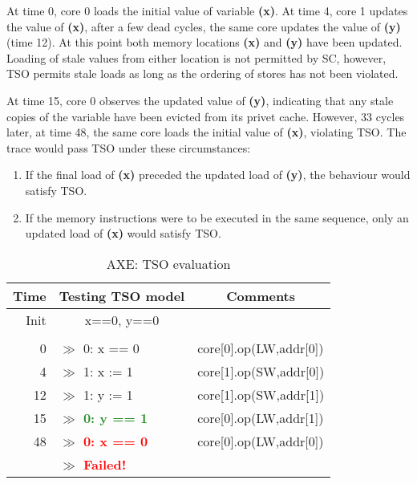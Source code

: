 			At time 0, core 0 loads the initial value of variable \textbf{(x)}. At time 4, core 1 updates the value of \textbf{(x)}, after a few dead cycles, the same core updates the value of \textbf{(y)} (time 12). At this point both memory locations \textbf{(x)} and \textbf{(y)} have been updated. Loading of stale values from either location is not permitted by SC, however, TSO permits stale loads as long as the ordering of stores has not been violated. 
			
			At time 15, core 0 observes the updated value of \textbf{(y)}, indicating that any stale copies of the variable have been evicted from its privet cache. However, 33 cycles later, at time 48, the same core loads the initial value of \textbf{(x)}, violating TSO. The trace would pass TSO under these circumstances:
			
			\begin{enumerate}
				\item If the final load of \textbf{(x)} preceded the updated load of \textbf{(y)}, the behaviour would satisfy TSO.
				\item If the memory instructions were to be executed in the same sequence, only an updated load of \textbf{(x)} would satisfy TSO.
			\end{enumerate}
			 
			\captionsetup[table]{name=Trace}
			\begin{table}[!h]
			\begin{center}
			\selectfont
			\begin{tabular}{|r|l|l|}
				\hline
				\textbf{Time} & \textbf{Testing TSO model} & \multicolumn{1}{c|}{\textbf{Comments}} \\
				\hline 
				Init & \multicolumn{1}{c|}{x==0, y==0} & \\
				& & \\
				0 & $\gg$ 0: x == 0 & core[0].op(LW,addr[0]) \\
				4 & $\gg$ 1: x := 1 & core[1].op(SW,addr[0]) \\
				12 & $\gg$ 1: y := 1 & core[1].op(SW,addr[1]) \\
				15 & $\gg$ \textbf{\textcolor{ForestGreen}{0: y == 1}} & core[0].op(LW,addr[1]) \\
				48 & $\gg$ \textbf{\textcolor{Red}{0: x == 0}} & core[0].op(LW,addr[0]) \\
				& $\gg$ \textbf{\textcolor{Red}{Failed!}} & \\
				\hline
			\end{tabular}
			\caption{AXE: TSO evaluation}
			\label{tso_test_mem}
			\end{center} 
			\end{table}
			\captionsetup[table]{name=Table}
			
